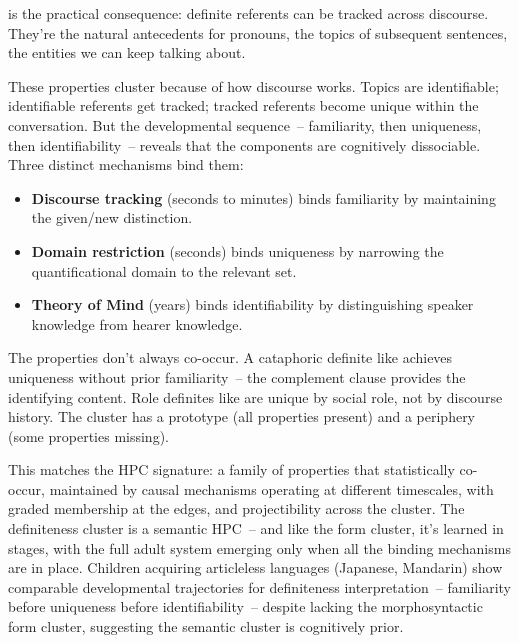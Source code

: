  is the practical consequence: definite referents can be tracked across discourse. They're the natural antecedents for pronouns, the topics of subsequent sentences, the entities we can keep talking about.

These properties cluster because of how discourse works. Topics are identifiable; identifiable referents get tracked; tracked referents become unique within the conversation. But the developmental sequence~-- familiarity, then uniqueness, then identifiability~-- reveals that the components are cognitively dissociable. Three distinct mechanisms bind them:

\begin{itemize}
    \item \textbf{Discourse tracking} (seconds to minutes) binds familiarity by maintaining the given/new distinction.
    \item \textbf{Domain restriction} (seconds) binds uniqueness by narrowing the quantificational domain to the relevant set.
    \item \textbf{Theory of Mind} (years) binds identifiability by distinguishing speaker knowledge from hearer knowledge.
\end{itemize}

The properties don't always co-occur. A cataphoric definite like  achieves uniqueness without prior familiarity~-- the complement clause provides the identifying content. Role definites like  are unique by social role, not by discourse history. The cluster has a prototype (all properties present) and a periphery (some properties missing).

This matches the HPC signature: a family of properties that statistically co-occur, maintained by causal mechanisms operating at different timescales, with graded membership at the edges, and projectibility across the cluster. The definiteness cluster is a semantic HPC~-- and like the form cluster, it's learned in stages, with the full adult system emerging only when all the binding mechanisms are in place. Children acquiring articleless languages (Japanese, Mandarin) show comparable developmental trajectories for definiteness interpretation~-- familiarity before uniqueness before identifiability~-- despite lacking the morphosyntactic form cluster, suggesting the semantic cluster is cognitively prior.

